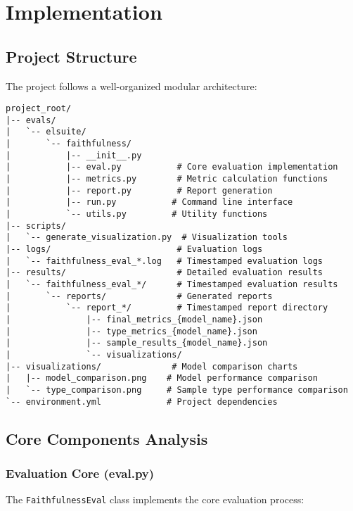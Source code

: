 \section{Implementation}

\subsection{Project Structure}
The project follows a well-organized modular architecture:

\begin{lstlisting}[basicstyle=\ttfamily\small,breaklines=true,columns=flexible]
project_root/
|-- evals/
|   `-- elsuite/
|       `-- faithfulness/
|           |-- __init__.py
|           |-- eval.py           # Core evaluation implementation
|           |-- metrics.py        # Metric calculation functions
|           |-- report.py         # Report generation
|           |-- run.py           # Command line interface
|           `-- utils.py         # Utility functions
|-- scripts/
|   `-- generate_visualization.py  # Visualization tools
|-- logs/                         # Evaluation logs
|   `-- faithfulness_eval_*.log   # Timestamped evaluation logs
|-- results/                      # Detailed evaluation results
|   `-- faithfulness_eval_*/      # Timestamped evaluation results
|       `-- reports/              # Generated reports
|           `-- report_*/         # Timestamped report directory
|               |-- final_metrics_{model_name}.json    
|               |-- type_metrics_{model_name}.json     
|               |-- sample_results_{model_name}.json   
|               `-- visualizations/                    
|-- visualizations/              # Model comparison charts
|   |-- model_comparison.png    # Model performance comparison
|   `-- type_comparison.png     # Sample type performance comparison
`-- environment.yml             # Project dependencies
\end{lstlisting}

\subsection{Core Components Analysis}

\subsubsection{Evaluation Core (eval.py)}
The \texttt{FaithfulnessEval} class implements the core evaluation process:

